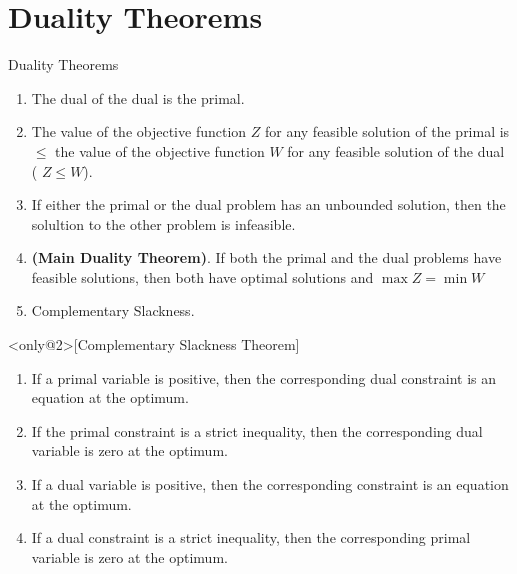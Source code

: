 
\section{Duality Theorems}
\label{sec:duality-theorems}

\begin{frame}{Duality Theorems}
  \begin{enumerate} \justifying \parskip4mm
\item<only@1> The dual of the dual is the primal.
\item<only@1> The value of the objective function $Z$ for any feasible solution of the primal is $\leq$ the value of the objective function $W$ for any feasible solution of the dual ( $Z \leq W$).
\item<only@1> If either the primal or the dual problem has an unbounded solution, then the solultion to the other problem is infeasible.
\item<only@1> \textbf{(Main Duality Theorem)}. If both the primal and the dual problems have feasible solutions, then both have optimal solutions and  $\max Z = \min W$
\item<only@1> Complementary Slackness.
\end{enumerate}

\begin{theorem}<only@2>[Complementary Slackness Theorem]
  \begin{enumerate} \justifying \parskip2mm
  \item If a \alert{primal variable is positive}, then the corresponding dual constraint is an equation at the optimum.
  \item If the \alert{primal constraint is a strict inequality}, then the corresponding dual variable
    is zero at the optimum.
    
  \item If a \alert{dual variable is positive}, then the corresponding constraint is an equation at the optimum.
  \item If a \alert{dual constraint is a strict inequality}, then the corresponding primal variable is zero at the optimum.
  \end{enumerate}
\end{theorem}
\end{frame}

